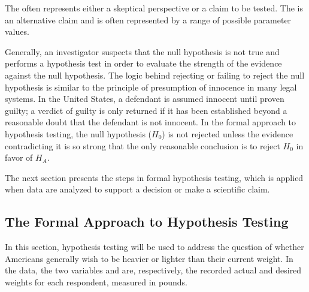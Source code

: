 \begin{termBox}{
  {The  often represents either a skeptical perspective or a claim to be tested. The  is an alternative claim and is often represented by a range of possible parameter values.}}
\end{termBox}

Generally, an investigator suspects that the null hypothesis is not true and performs a hypothesis test in order to evaluate the strength of the evidence against the null hypothesis. The logic behind rejecting or failing to reject the null hypothesis is similar to the principle of presumption of innocence in many legal systems. In the United States, a defendant is assumed innocent until proven guilty; a verdict of guilty is only returned if it has been established beyond a reasonable doubt that the defendant is not innocent. In the formal approach to hypothesis testing, the null hypothesis ($H_0$) is not rejected unless the evidence contradicting it is so strong that the only reasonable conclusion is to reject $H_0$ in favor of $H_A$. 

The next section presents the steps in formal hypothesis testing, which is applied when data are analyzed to support a decision or make a scientific claim.

\subsection{The Formal Approach to Hypothesis Testing}
\label{formalHypothesisTesting}

In this section, hypothesis testing will be used to address the question of whether Americans generally wish to be heavier or lighter than their current weight. In the  data, the two variables  and  are, respectively, the recorded actual and desired weights for each respondent, measured in pounds. 

